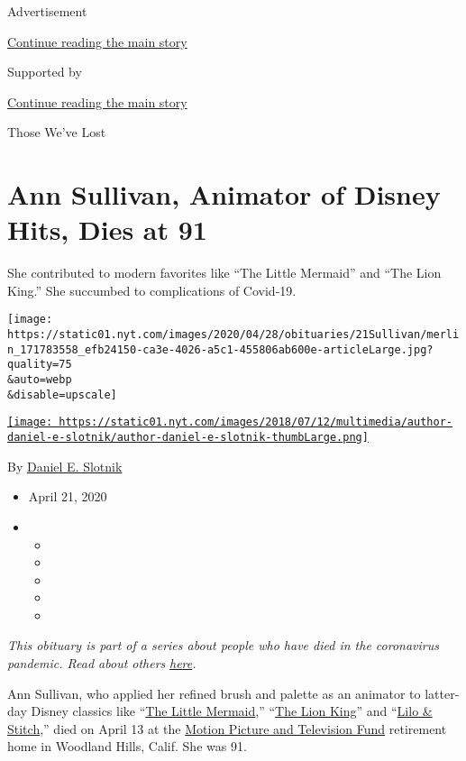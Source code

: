Advertisement

\protect\hyperlink{after-top}{Continue reading the main story}

Supported by

\protect\hyperlink{after-sponsor}{Continue reading the main story}

Those We've Lost

\hypertarget{ann-sullivan-animator-of-disney-hits-dies-at-91}{%
\section{Ann Sullivan, Animator of Disney Hits, Dies at
91}\label{ann-sullivan-animator-of-disney-hits-dies-at-91}}

She contributed to modern favorites like ``The Little Mermaid'' and
``The Lion King.'' She succumbed to complications of Covid-19.

\texttt{[image: https://static01.nyt.com/images/2020/04/28/obituaries/21Sullivan/merlin\_171783558\_efb24150-ca3e-4026-a5c1-455806ab600e-articleLarge.jpg?quality=75\\\&auto=webp\\\&disable=upscale]}

\href{https://www.nytimes.com/by/daniel-e-slotnik}{\texttt{[image: https://static01.nyt.com/images/2018/07/12/multimedia/author-daniel-e-slotnik/author-daniel-e-slotnik-thumbLarge.png]}}

By \href{https://www.nytimes.com/by/daniel-e-slotnik}{Daniel E. Slotnik}

\begin{itemize}
\item
  April 21, 2020
\item
  \begin{itemize}
  \item
  \item
  \item
  \item
  \item
  \end{itemize}
\end{itemize}

\emph{This obituary is part of a series about people who have died in
the coronavirus pandemic. Read about others}
\href{https://www.nytimes.com/series/people-who-have-died-of-the-coronavirus}{\emph{here}}\emph{.}

Ann Sullivan, who applied her refined brush and palette as an animator
to latter-day Disney classics like
``\href{https://www.nytimes.com/1989/11/15/movies/review-film-andersen-s-mermaid-by-way-of-disney.html}{The
Little Mermaid},''
``\href{https://www.nytimes.com/1994/06/15/movies/review-film-the-hero-within-the-child-within.html}{The
Lion King}'' and
``\href{https://www.nytimes.com/2002/06/21/movies/film-review-escaping-deep-space-exile-and-making-friends-in-hawaii.html}{Lilo
\& Stitch},'' died on April 13 at the \href{https://mptf.com/}{Motion
Picture and Television Fund} retirement home in Woodland Hills, Calif.
She was 91.

